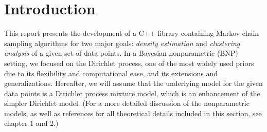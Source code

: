 \chapter{Introduction}
This report presents the development of a C++ library containing Markov chain sampling algorithms for two major goals: \emph{density estimation} and \emph{clustering analysis} of a given set of data points.
In a Bayesian nonparametric (BNP) setting, we focused on the Dirichlet process, one of the most widely used priors due to its flexibility and computational ease, and its extensions and generalizations.
Hereafter, we will assume that the underlying model for the given data points is a Dirichlet process mixture model, which is an enhancement of the simpler Dirichlet model.
(For a more detailed discussion of the nonparametric models, as well as references for all theoretical details included in this section, see \cite{book} chapter 1 and 2.)


